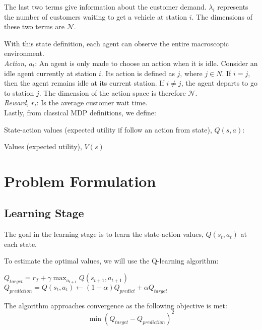 The last two terms give information about the customer demand. $\lambda_i$ represents the number of customers waiting to get a vehicle at station $i$.  The dimensions of these two terms are $\mathcal{N}$.

With this state definition, each agent can observe the entire macroscopic environment.\\

\noindent \textit{Action, $a_t$}: An agent is only made to choose an action when it is idle. Consider an idle agent currently at station $i$. Its action is defined as $j$, where $j\in N$. If $i = j$, then the agent remains idle at its current station. If $i \neq j$, the agent departs to go to station $j$. The dimension of the action space is therefore $\mathcal{N}$. \\

\noindent \textit{Reward, $r_t$}: Is the average customer wait time. \\ 

\noindent Lastly, from classical MDP definitions, we define:

State-action values (expected utility if follow an action from state), $Q(s,a)$: 

Values (expected utility), $ V(s)$  

\section{Problem Formulation }
\subsection{Learning Stage}
The goal in the learning stage is to learn the state-action values, $Q(s_t,a_t)$ at each state.

To estimate the optimal values, we will use the Q-learning algorithm:
\begin{algorithmic}
    \State $Q_{target} = r_T+\gamma \max_{a_{t+1}} Q(s_{t+1},a_{t+1})$
    \State $Q_{prediction} = Q(s_t,a_t) \leftarrow (1-\alpha)Q_{predict}+\alpha Q_{target}$
\EndFor\\
\end{algorithmic}

The algorithm approaches convergence as the following objective is met:
\begin{equation}
        \min (Q_{target} - Q_{prediction})^2
\end{equation}

